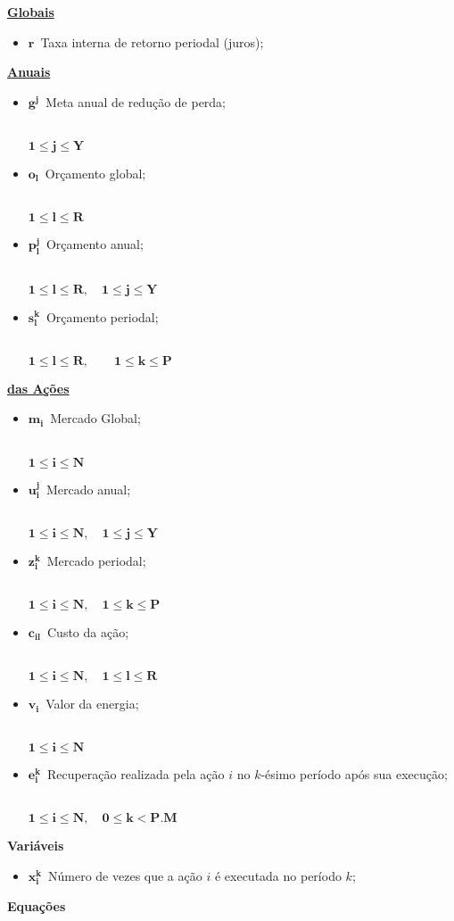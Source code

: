 \documentclass{article}
\newcommand{\topico}[1]{
  \vspace{20pt}
  {\Large \bf #1 }
}
\newcommand{\subtopico}[1]{
  {\large \bf \underline{#1}}
  \\
}
\newcommand{\variavel}[1]{
  { \Large $ \bm{ #1 } \, $}
}
\newcommand{\decorator}[1]{
  {\\ \scriptsize \hspace*{12pt} $ \bm{ #1 } $ }
}
\begin{document}
\begin{multicols}{2}

\subtopico{Globais}
\begin{itemize}
  \item \variavel{r} Taxa interna de retorno periodal (juros);
\end{itemize}

\subtopico{Anuais}
\begin{itemize}
  \item \variavel{g^j} Meta anual de redução de perda;
    \decorator{1 \leq j \leq Y}
  \item \variavel{o_l} Orçamento global;
    \decorator{1 \leq l \leq R}
  \item \variavel{p_l^j} Orçamento anual;
    \decorator{1 \leq l \leq R, \quad 1 \leq j \leq Y}
  \item \variavel{s_l^{k}} Orçamento periodal;
    \decorator{1 \leq l \leq R, \quad \quad 1 \leq k \leq P}
\end{itemize}

\vfill \columnbreak

\subtopico{das Ações}
\begin{itemize}
  \item \variavel{m_i} Mercado Global;
    \decorator{1 \leq i \leq N}
  \item \variavel{u_i^j} Mercado anual;
    \decorator{1 \leq i \leq N, \quad 1 \leq j \leq Y}
  \item \variavel{z_i^k} Mercado periodal;
    \decorator{1 \leq i \leq N, \quad 1 \leq k \leq P}
  \item \variavel{c_{il}} Custo da ação;
    \decorator{1 \leq i \leq N, \quad 1 \leq l \leq R}
  \item \variavel{v_i} Valor da energia;
    \decorator{1 \leq i \leq N}
  \item \variavel{e_i^k} Recuperação realizada pela ação $i$ no $k$-ésimo período
    após sua execução;
    \decorator{1 \leq i \leq N, \quad 0 \leq k < P.M}
\end{itemize}

\end{multicols}

\pagebreak

\topico{Variáveis}
\begin{itemize}
  \item \variavel{x_i^k} Número de vezes que a ação $i$ é executada no período $k$;
\end{itemize}

\topico{Equações}
\end{document}
